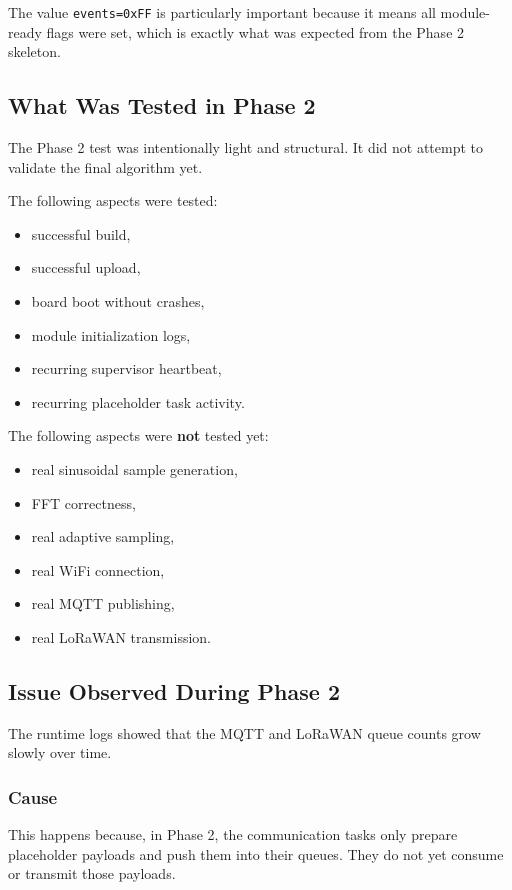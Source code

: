 \documentclass[12pt,a4paper]{article}
\begin{document}
The value \texttt{events=0xFF} is particularly important because it means all
module-ready flags were set, which is exactly what was expected from the Phase
2 skeleton.

\subsection{What Was Tested in Phase 2}

The Phase 2 test was intentionally light and structural. It did not attempt to
validate the final algorithm yet.

The following aspects were tested:

\begin{itemize}
    \item successful build,
    \item successful upload,
    \item board boot without crashes,
    \item module initialization logs,
    \item recurring supervisor heartbeat,
    \item recurring placeholder task activity.
\end{itemize}

The following aspects were \textbf{not} tested yet:

\begin{itemize}
    \item real sinusoidal sample generation,
    \item FFT correctness,
    \item real adaptive sampling,
    \item real WiFi connection,
    \item real MQTT publishing,
    \item real LoRaWAN transmission.
\end{itemize}

\subsection{Issue Observed During Phase 2}

The runtime logs showed that the MQTT and LoRaWAN queue counts grow slowly over
time.

\subsubsection*{Cause}

This happens because, in Phase 2, the communication tasks only prepare
placeholder payloads and push them into their queues. They do not yet consume
or transmit those payloads.
\end{document}

